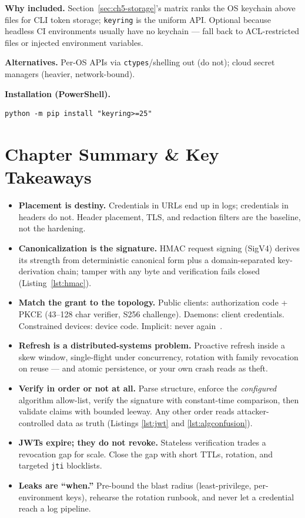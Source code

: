 \textbf{Why included.} Section~\ref{sec:ch5-storage}'s matrix ranks the OS
keychain above files for CLI token storage; \texttt{keyring} is the uniform
API. Optional because headless CI environments usually have no keychain ---
fall back to ACL-restricted files or injected environment variables.

\textbf{Alternatives.} Per-OS APIs via \texttt{ctypes}/shelling out (do
not); cloud secret managers (heavier, network-bound).

\textbf{Installation (PowerShell).}
\begin{verbatim}
python -m pip install "keyring>=25"
\end{verbatim}

\section{Chapter Summary \& Key Takeaways}
\label{sec:ch5-summary}

\begin{itemize}
  \item \textbf{Placement is destiny.} Credentials in URLs end up in logs;
        credentials in headers do not. Header placement, TLS, and redaction
        filters are the baseline, not the hardening.
  \item \textbf{Canonicalization is the signature.} HMAC request signing
        (SigV4) derives its strength from deterministic canonical form plus
        a domain-separated key-derivation chain; tamper with any byte and
        verification fails closed (Listing~\ref{lst:hmac}).
  \item \textbf{Match the grant to the topology.} Public clients:
        authorization code + PKCE (43--128 char verifier, S256 challenge).
        Daemons: client credentials. Constrained devices: device code.
        Implicit: never again~\cite{rfc6749,rfc7636}.
  \item \textbf{Refresh is a distributed-systems problem.} Proactive refresh
        inside a skew window, single-flight under concurrency, rotation with
        family revocation on reuse --- and atomic persistence, or your own
        crash reads as theft.
  \item \textbf{Verify in order or not at all.} Parse structure, enforce
        the \emph{configured} algorithm allow-list, verify the signature
        with constant-time comparison, then validate claims with bounded
        leeway. Any other order reads attacker-controlled data as truth
        (Listings \ref{lst:jwt} and \ref{lst:algconfusion}).
  \item \textbf{JWTs expire; they do not revoke.} Stateless verification
        trades a revocation gap for scale. Close the gap with short TTLs,
        rotation, and targeted \texttt{jti} blocklists.
  \item \textbf{Leaks are ``when.''} Pre-bound the blast radius
        (least-privilege, per-environment keys), rehearse the rotation
        runbook, and never let a credential reach a log pipeline.
\end{itemize}

